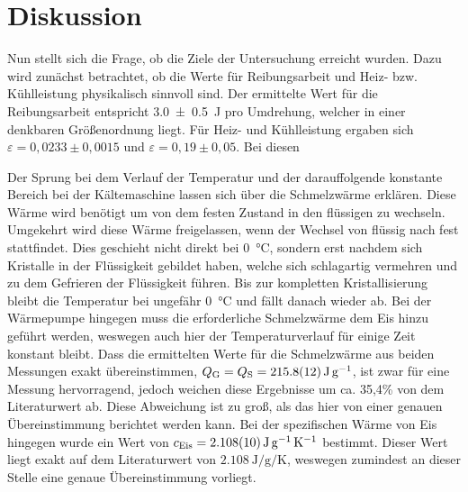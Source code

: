 \section{Diskussion}
	
	Nun stellt sich die Frage, ob die Ziele der Untersuchung erreicht wurden.
	Dazu wird zunächst betrachtet, ob die Werte für Reibungsarbeit und Heiz- bzw. Kühlleistung physikalisch sinnvoll sind.
	Der ermittelte Wert für die Reibungsarbeit entspricht \SI{3.0+-0.5}{\joule} pro Umdrehung, welcher in einer denkbaren Größenordnung liegt.
	Für Heiz- und Kühlleistung ergaben sich $\varepsilon = 0,0233\pm 0,0015$ und $\varepsilon = 0,19\pm 0,05$.
	Bei diesen %
	
	Der Sprung bei dem Verlauf der Temperatur und der darauffolgende konstante Bereich bei der Kältemaschine lassen sich über die Schmelzwärme erklären.
	Diese Wärme wird benötigt um von dem festen Zustand in den flüssigen zu wechseln.
	Umgekehrt wird diese Wärme freigelassen, wenn der Wechsel von flüssig nach fest stattfindet.
	Dies geschieht nicht direkt bei \SI{0}{\celsius}, sondern erst nachdem sich Kristalle in der Flüssigkeit gebildet haben, welche sich schlagartig vermehren und zu dem Gefrieren der Flüssigkeit führen.
	Bis zur kompletten Kristallisierung bleibt die Temperatur bei ungefähr \SI{0}{\celsius} und fällt danach wieder ab.
	Bei der Wärmepumpe hingegen muss die erforderliche Schmelzwärme dem Eis hinzu geführt werden, weswegen auch hier der Temperaturverlauf für einige Zeit konstant bleibt. 
	Dass die ermittelten Werte für die Schmelzwärme aus beiden Messungen exakt übereinstimmen, $Q_\text{G} = Q_\text{S} = \SI{215.8+-1.2}{\joule\per\gram}$, ist zwar für eine Messung hervorragend, jedoch weichen diese Ergebnisse um ca. 35,4\% von dem Literaturwert\cite{Toolbox} ab.
	Diese Abweichung ist zu groß, als das hier von einer genauen Übereinstimmung berichtet werden kann.
	Bei der spezifischen Wärme von Eis hingegen wurde ein Wert von $c_\text{Eis}=\SI{2.108+-0.010}{\joule\per\gram\per\kelvin}$ bestimmt. 
	Dieser Wert liegt exakt auf dem Literaturwert\cite{Toolbox} von $\SI{2.108}{\joule\per\gram\per\kelvin}$, weswegen zumindest an dieser Stelle eine genaue Übereinstimmung vorliegt.
	